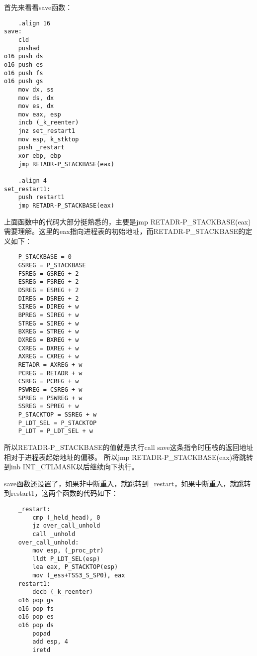 \documentclass[a4paper,left=2.5cm,right=2.5cm,11pt]{report}
\begin{document}
	首先来看看save函数：
	\begin{lstlisting}
	.align 16
save:
	cld
	pushad
o16 push ds
o16	push es
o16	push fs
o16	push gs
	mov dx, ss
	mov ds, dx
	mov es, dx
	mov eax, esp
	incb (_k_reenter)
	jnz set_restart1
	mov esp, k_stktop
	push _restart
	xor ebp, ebp
	jmp RETADR-P_STACKBASE(eax)

	.align 4
set_restart1:
	push restart1
	jmp RETADR-P_STACKBASE(eax)
	\end{lstlisting}

	上面函数中的代码大部分挺熟悉的，主要是jmp RETADR-P\_STACKBASE(eax)需要理解。这里的eax指向进程表的初始地址，而RETADR-P\_STACKBASE的定义如下：
	\begin{lstlisting}
	P_STACKBASE = 0
	GSREG = P_STACKBASE
	FSREG = GSREG + 2
	ESREG = FSREG + 2
	DSREG = ESREG + 2
	DIREG = DSREG + 2
	SIREG = DIREG + w
	BPREG = SIREG + w
	STREG = SIREG + w
	BXREG = STREG + w
	DXREG = BXREG + w
	CXREG = DXREG + w
	AXREG = CXREG + w
	RETADR = AXREG + w
	PCREG = RETADR + w
	CSREG = PCREG + w
	PSWREG = CSREG + w
	SPREG = PSWREG + w
	SSREG = SPREG + w
	P_STACKTOP = SSREG + w
	P_LDT_SEL = P_STACKTOP
	P_LDT = P_LDT_SEL + w
	\end{lstlisting}

	所以RETADR-P\_STACKBASE的值就是执行call save这条指令时压栈的返回地址相对于进程表起始地址的偏移。
	所以jmp RETADR-P\_STACKBASE(eax)将跳转到inb INT\_CTLMASK以后继续向下执行。\par

	save函数还设置了，如果非中断重入，就跳转到\_restart，如果中断重入，就跳转到restart1，这两个函数的代码如下：
	\begin{lstlisting}
	_restart:
		cmp (_held_head), 0
		jz over_call_unhold
		call _unhold
	over_call_unhold:
		mov esp, (_proc_ptr)
		lldt P_LDT_SEL(esp)
		lea eax, P_STACKTOP(esp)
		mov (_ess+TSS3_S_SP0), eax
	restart1:
		decb (_k_reenter)
	o16 pop gs
	o16 pop fs
	o16 pop es
	o16 pop ds
		popad
		add esp, 4
		iretd
	\end{lstlisting}
\end{document}
